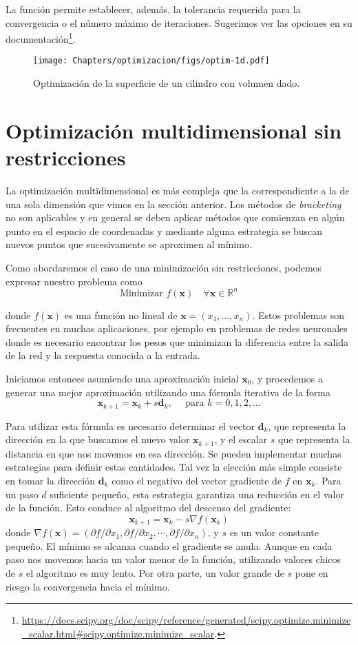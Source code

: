 La función  permite establecer, además, la tolerancia requerida para la convergencia o el número máximo de iteraciones. Sugerimos ver las opciones en su documentación\footnote{\url{https://docs.scipy.org/doc/scipy/reference/generated/scipy.optimize.minimize_scalar.html\#scipy.optimize.minimize_scalar}.}.
\begin{figure}[t]
 \centering
 \texttt{[image: Chapters/optimizacion/figs/optim-1d.pdf]}
 \caption{Optimización de la superficie de un cilindro con volumen dado.}
 \label{fig:opt-1d}
\end{figure}

\section{Optimización multidimensional sin restricciones} \label{sec:omsr}
La optimización multidimensional es más compleja que la correspondiente a la de una sola dimensión que vimos en la sección anterior. Los métodos de \textit{bracketing} no son aplicables y en general se deben aplicar métodos que comienzan en algún punto en el espacio de coordenadas y mediante alguna estrategia se buscan nuevos puntos que sucesivamente se aproximen al mínimo.

Como abordaremos el caso de una minimización sin restricciones, podemos expresar nuestro problema como
\[ \text{Minimizar } f(\bm{x}) \quad \forall \bm{x} \in \mathbb{R}^n \]

donde $f(\bm{x})$ es una función no lineal de $\bm{x} = (x_1, \ldots, x_n)$. Estos problemas son frecuentes en muchas aplicaciones, por ejemplo en problemas de redes neuronales donde es necesario encontrar los pesos que minimizan la diferencia entre la salida de la red y la respuesta conocida a la entrada.

Iniciamos entonces asumiendo una aproximación inicial $\bm{x}_0$, y procedemos a generar una mejor aproximación utilizando una fórmula iterativa de la forma
\[ \bm{x}_{k + 1} = \bm{x}_k + s \bm{d}_k, \quad \text{ para } k = 0, 1, 2, \ldots \]

Para utilizar esta fórmula es necesario determinar el vector $\bm{d}_k$, que representa la dirección en la que buscamos el nuevo valor $\bm{x}_{k+1}$, y el escalar $s$ que representa la distancia en que nos movemos en esa dirección. Se pueden implementar muchas estrategias para definir estas cantidades. Tal vez la elección más simple consiste en tomar la dirección $\bm{d}_k$ como el negativo del vector gradiente de $f$ en $\bm{x}_k$. Para un paso $d$ suficiente pequeño, esta estrategia garantiza una reducción en el valor de la función. Esto conduce al algoritmo del descenso del gradiente:
\[ \bm{x}_{k+1} = \bm{x}_k - s \nabla f(\bm{x}_k) \]
donde $\nabla f(\bm{x}) = (\partial f / \partial x_1, \partial f / \partial x_2, \cdots, \partial f / \partial x_n)$, y $s$ es un valor constante pequeño. El mínimo se alcanza cuando el gradiente se anula. Aunque en cada paso nos movemos hacia un valor menor de la función, utilizando valores chicos de $s$ el algoritmo es muy lento. Por otra parte, un valor grande de $s$ pone en riesgo la convergencia hacia el mínimo.

